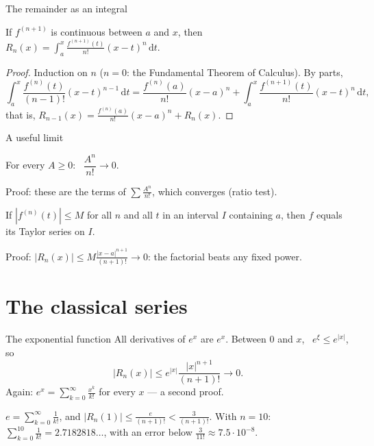 \documentclass{wosm-slides}
\newcommand{\dt}{\,\mathrm{d}t}
\begin{document}
\begin{frame}{The remainder as an integral}
  \begin{theorem}
    If $f^{(n+1)}$ is continuous between $a$ and $x$, then
    $R_n(x) = \int_a^x \frac{f^{(n+1)}(t)}{n!} (x - t)^n \dt$.
  \end{theorem}
  \begin{proof}
    Induction on $n$ ($n = 0$: the Fundamental Theorem of Calculus). By parts,
    \[ \int_a^x \frac{f^{(n)}(t)}{(n-1)!} (x - t)^{n-1} \dt
       = \frac{f^{(n)}(a)}{n!} (x - a)^n + \int_a^x \frac{f^{(n+1)}(t)}{n!} (x - t)^n \dt , \]
    that is, $R_{n-1}(x) = \frac{f^{(n)}(a)}{n!}(x-a)^n + R_n(x)$.
  \end{proof}
\end{frame}

\begin{frame}{A useful limit}
  \begin{lemma}
    For every $A \ge 0$: \ $\dfrac{A^n}{n!} \to 0$.
  \end{lemma}
  {\small Proof: these are the terms of $\sum \frac{A^n}{n!}$, which converges (ratio test).\par}
  \pause
  \begin{corollary}
    If $|f^{(n)}(t)| \le M$ for all $n$ and all $t$ in an interval $I$ containing $a$, then
    $f$ equals its Taylor series on $I$.
  \end{corollary}
  {\small Proof: $|R_n(x)| \le M \frac{|x - a|^{n+1}}{(n+1)!} \to 0$: the factorial beats any
  fixed power.\par}
\end{frame}

\section{The classical series}

\begin{frame}{The exponential function}
  All derivatives of $e^x$ are $e^x$. Between $0$ and $x$, \ $e^\xi \le e^{|x|}$, so
  \[ |R_n(x)| \le e^{|x|} \frac{|x|^{n+1}}{(n+1)!} \to 0 . \]
  Again: $e^x = \sum_{k=0}^\infty \frac{x^k}{k!}$ for every $x$ --- a second proof.
  \pause
  \begin{example}[Computing $e$]
    $e = \sum_{k=0}^\infty \frac{1}{k!}$, and $|R_n(1)| \le \frac{e}{(n+1)!} < \frac{3}{(n+1)!}$.
    With $n = 10$: \ $\sum_{k=0}^{10} \frac{1}{k!} = 2.7182818\ldots$, with an error below
    $\frac{3}{11!} \approx 7.5 \cdot 10^{-8}$.
  \end{example}
\end{frame}
\end{document}
